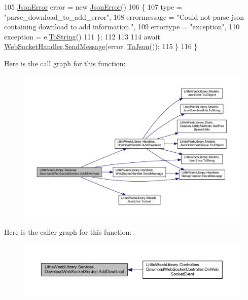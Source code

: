 \begin{DoxyCode}
105                 \mbox{\hyperlink{class_little_weeb_library_1_1_models_1_1_json_error}{JsonError}} error = \textcolor{keyword}{new} \mbox{\hyperlink{class_little_weeb_library_1_1_models_1_1_json_error}{JsonError}}()
106                 \{
107                     type = \textcolor{stringliteral}{"parse\_download\_to\_add\_error"},
108                     errormessage = \textcolor{stringliteral}{"Could not parse json containing download to add information."},
109                     errortype = \textcolor{stringliteral}{"exception"},
110                     exception = e.\mbox{\hyperlink{class_little_weeb_library_1_1_models_1_1_json_error_ad7d5522c90119111d2e929f39e7f6d3c}{ToString}}()
111                 \};
112 
113 
114                 await \mbox{\hyperlink{class_little_weeb_library_1_1_handlers_1_1_web_socket_handler}{WebSocketHandler}}.\mbox{\hyperlink{class_little_weeb_library_1_1_handlers_1_1_web_socket_handler_a1de289d54d665a32c93478c68d3e6ad0}{SendMessage}}(error.
      \mbox{\hyperlink{class_little_weeb_library_1_1_models_1_1_json_error_a0e3e7dd2e2990404b7f0461742b23440}{ToJson}}());
115             \}
116         \}
\end{DoxyCode}
Here is the call graph for this function\+:\nopagebreak
\begin{figure}[H]
\begin{center}
\leavevmode
\includegraphics[width=350pt]{class_little_weeb_library_1_1_services_1_1_download_web_socket_service_a7aaa1db63ee81a2e5246e45ef8643087_cgraph}
\end{center}
\end{figure}
Here is the caller graph for this function\+:\nopagebreak
\begin{figure}[H]
\begin{center}
\leavevmode
\includegraphics[width=350pt]{class_little_weeb_library_1_1_services_1_1_download_web_socket_service_a7aaa1db63ee81a2e5246e45ef8643087_icgraph}
\end{center}
\end{figure}
